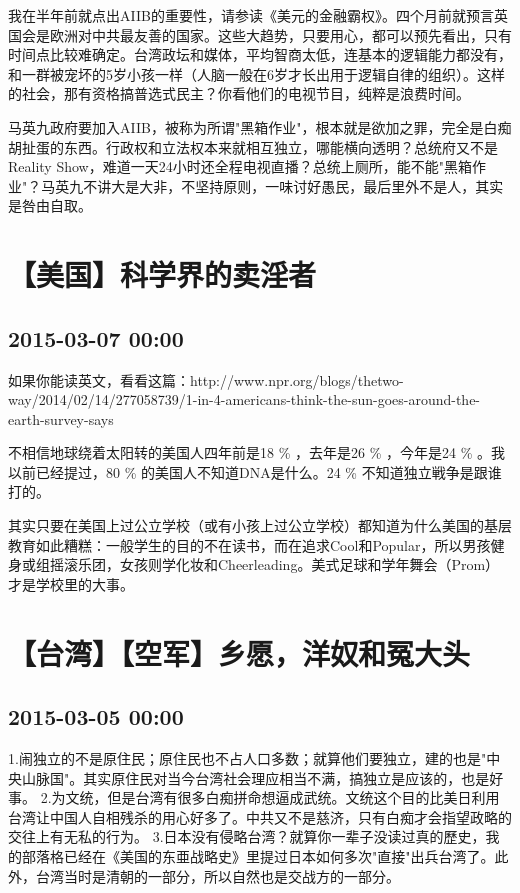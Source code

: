 \documentclass[twocolumn]{ctexart}
\begin{document}
我在半年前就点出AIIB的重要性，请参读《美元的金融霸权》。四个月前就预言英国会是欧洲对中共最友善的国家。这些大趋势，只要用心，都可以预先看出，只有时间点比较难确定。台湾政坛和媒体，平均智商太低，连基本的逻辑能力都没有，和一群被宠坏的5岁小孩一样（人脑一般在6岁才长出用于逻辑自律的组织）。这样的社会，那有资格搞普选式民主？你看他们的电视节目，纯粹是浪费时间。

马英九政府要加入AIIB，被称为所谓"黑箱作业"，根本就是欲加之罪，完全是白痴胡扯蛋的东西。行政权和立法权本来就相互独立，哪能横向透明？总统府又不是Reality Show，难道一天24小时还全程电视直播？总统上厕所，能不能"黑箱作业"？马英九不讲大是大非，不坚持原则，一味讨好愚民，最后里外不是人，其实是咎由自取。\section*{【美国】科学界的卖淫者}
\subsection*{2015-03-07 00:00}
如果你能读英文，看看这篇：http://www.npr.org/blogs/thetwo-way/2014/02/14/277058739/1-in-4-americans-think-the-sun-goes-around-the-earth-survey-says

不相信地球绕着太阳转的美国人四年前是18 \% ，去年是26 \% ，今年是24 \% 。我以前已经提过，80 \% 的美国人不知道DNA是什么。24 \% 不知道独立戦争是跟谁打的。

其实只要在美国上过公立学校（或有小孩上过公立学校）都知道为什么美国的基层教育如此糟糕：一般学生的目的不在读书，而在追求Cool和Popular，所以男孩健身或组摇滚乐团，女孩则学化妆和Cheerleading。美式足球和学年舞会（Prom）才是学校里的大事。\section*{【台湾】【空军】乡愿，洋奴和冤大头}
\subsection*{2015-03-05 00:00}
1.闹独立的不是原住民；原住民也不占人口多数；就算他们要独立，建的也是"中央山脉国"。其实原住民对当今台湾社会理应相当不满，搞独立是应该的，也是好事。
2.为文统，但是台湾有很多白痴拼命想逼成武统。文统这个目的比美日利用台湾让中国人自相残杀的用心好多了。中共又不是慈济，只有白痴才会指望政略的交往上有无私的行为。
3.日本没有侵略台湾？就算你一辈子没读过真的歷史，我的部落格已经在《美国的东亜战略史》里提过日本如何多次"直接"出兵台湾了。此外，台湾当时是清朝的一部分，所以自然也是交战方的一部分。
\end{document}
